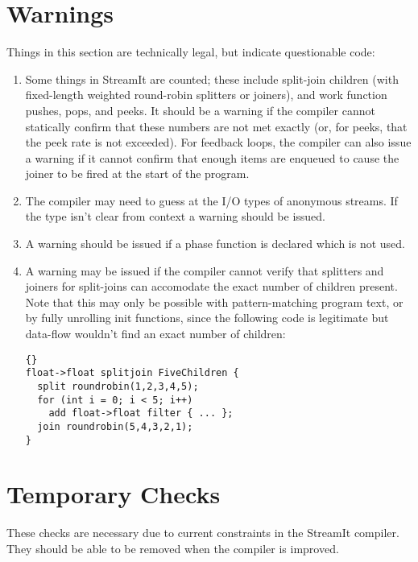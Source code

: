 \documentclass[11pt]{article}
\begin{document}
\section{Warnings}

Things in this section are technically legal, but indicate
questionable code:

\begin{enumerate}
\item Some things in StreamIt are counted; these include split-join
  children (with fixed-length weighted round-robin splitters or
  joiners), and work function pushes, pops, and peeks.  It should be a
  warning if the compiler cannot statically confirm that these numbers
  are not met exactly (or, for peeks, that the peek rate is not
  exceeded).   For feedback loops, the compiler can also issue a
  warning if it cannot confirm that enough items are enqueued to cause
  the joiner to be fired at the start of the program.
\item The compiler may need to guess at the I/O types of anonymous
  streams.  If the type isn't clear from context a warning should be
  issued.
\item A warning should be issued if a phase function is declared which
  is not used.
\item A warning may be issued if the compiler cannot verify that
  splitters and joiners for split-joins can accomodate the exact
  number of children present.  Note that this may only be possible
  with pattern-matching program text, or by fully unrolling init
  functions, since the following code is legitimate but data-flow
  wouldn't find an exact number of children:

\begin{lstlisting}{}
float->float splitjoin FiveChildren {
  split roundrobin(1,2,3,4,5);
  for (int i = 0; i < 5; i++)
    add float->float filter { ... };
  join roundrobin(5,4,3,2,1);
}
\end{lstlisting}
\end{enumerate}

\section{Temporary Checks}

These checks are necessary due to current constraints in the StreamIt
compiler.  They should be able to be removed when the compiler is
improved.
\end{document}
